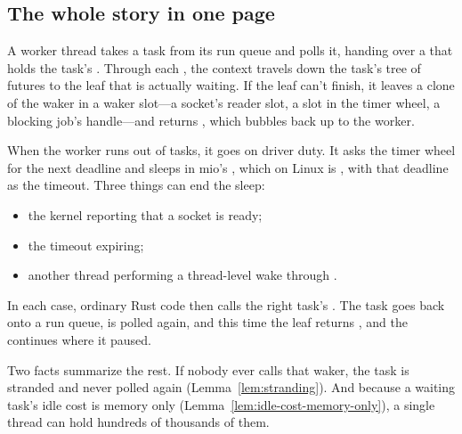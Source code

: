 \subsection{The whole story in one page}
\label{sec:wakers-afterword}

A worker thread takes a task from its run queue and polls it, handing over a  that holds the task's . Through each , the context travels down the task's tree of futures to the leaf that is actually waiting. If the leaf can't finish, it leaves a clone of the waker in a waker slot---a socket's reader slot, a slot in the timer wheel, a blocking job's handle---and returns , which bubbles back up to the worker.

When the worker runs out of tasks, it goes on driver duty. It asks the timer wheel for the next deadline and sleeps in mio's , which on Linux is , with that deadline as the timeout. Three things can end the sleep:

\begin{itemize}
    \item the kernel reporting that a socket is ready;
    \item the timeout expiring;
    \item another thread performing a thread-level wake through .
\end{itemize}

In each case, ordinary Rust code then calls the right task's . The task goes back onto a run queue, is polled again, and this time the leaf returns , and the  continues where it paused.

Two facts summarize the rest. If nobody ever calls that waker, the task is stranded and never polled again (Lemma~\ref{lem:stranding}). And because a waiting task's idle cost is memory only (Lemma~\ref{lem:idle-cost-memory-only}), a single thread can hold hundreds of thousands of them.

